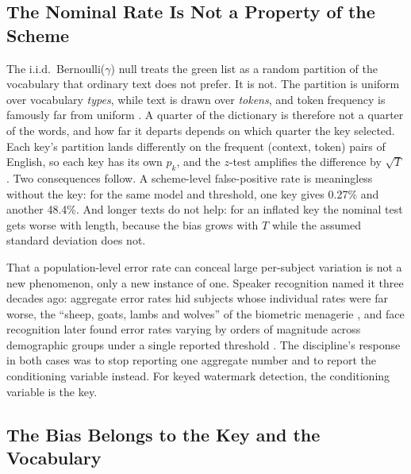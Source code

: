 \documentclass[conference]{IEEEtran}
\begin{document}
\subsection{The Nominal Rate Is Not a Property of the Scheme}

The i.i.d.\ Bernoulli($\gamma$) null treats the green list as a random partition
of the vocabulary that ordinary text does not prefer. It is not. The partition is
uniform over vocabulary \emph{types}, while text is drawn over \emph{tokens}, and
token frequency is famously far from uniform \citep{piantadosi2014zipf}. A quarter
of the dictionary is therefore not a quarter of the words, and how far it departs
depends on which quarter the key selected. Each key's partition lands differently
on the frequent (context, token) pairs of English, so each key has its own $p_k$,
and the $z$-test amplifies the difference by $\sqrt{T}$. Two consequences
follow. A scheme-level false-positive rate is meaningless without
the key: for the same model and threshold, one key gives 0.27\% and another
48.4\%. And longer texts do not help: for an inflated key the nominal test gets
worse with length, because the bias grows with $T$ while the assumed standard
deviation does not.

That a population-level error rate can conceal large per-subject variation is not
a new phenomenon, only a new instance of one. Speaker recognition named it three
decades ago: aggregate error rates hid subjects whose individual rates were far
worse, the ``sheep, goats, lambs and wolves'' of the biometric menagerie
\citep{doddington1998zoo}, and face recognition later found error rates varying by
orders of magnitude across demographic groups under a single reported threshold
\citep{grother2019frvt}. The discipline's response in both cases was to stop
reporting one aggregate number and to report the conditioning variable instead.
For keyed watermark detection, the conditioning variable is the key.

\subsection{The Bias Belongs to the Key and the Vocabulary}
\end{document}
